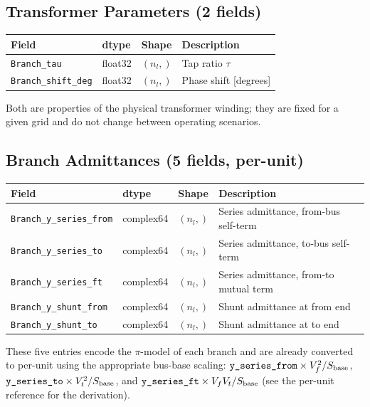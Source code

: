 \documentclass{article}
\begin{document}
\subsection{Transformer Parameters (2 fields)}

\begin{table}[h]
\centering
\begin{tabular}{llll}
\toprule
Field & dtype & Shape & Description \\
\midrule
\texttt{Branch\_tau}       & float32 & $(n_l,)$ & Tap ratio $\tau$ \\
\texttt{Branch\_shift\_deg} & float32 & $(n_l,)$ & Phase shift [degrees] \\
\bottomrule
\end{tabular}
\end{table}

Both are properties of the physical transformer winding; they are fixed
for a given grid and do not change between operating scenarios.

\subsection{Branch Admittances (5 fields, per-unit)}

\begin{table}[h]
\centering
\begin{tabular}{llll}
\toprule
Field & dtype & Shape & Description \\
\midrule
\texttt{Branch\_y\_series\_from} & complex64 & $(n_l,)$ &
  Series admittance, from-bus self-term \\
\texttt{Branch\_y\_series\_to}   & complex64 & $(n_l,)$ &
  Series admittance, to-bus self-term \\
\texttt{Branch\_y\_series\_ft}   & complex64 & $(n_l,)$ &
  Series admittance, from-to mutual term \\
\texttt{Branch\_y\_shunt\_from}  & complex64 & $(n_l,)$ &
  Shunt admittance at from end \\
\texttt{Branch\_y\_shunt\_to}    & complex64 & $(n_l,)$ &
  Shunt admittance at to end \\
\bottomrule
\end{tabular}
\end{table}

These five entries encode the $\pi$-model of each branch and are already
converted to per-unit using the appropriate bus-base scaling:
$\texttt{y\_series\_from} \times V_f^2/S_{\rm base}$,
$\texttt{y\_series\_to} \times V_t^2/S_{\rm base}$, and
$\texttt{y\_series\_ft} \times V_f V_t/S_{\rm base}$
(see the per-unit reference for the derivation).
\end{document}
